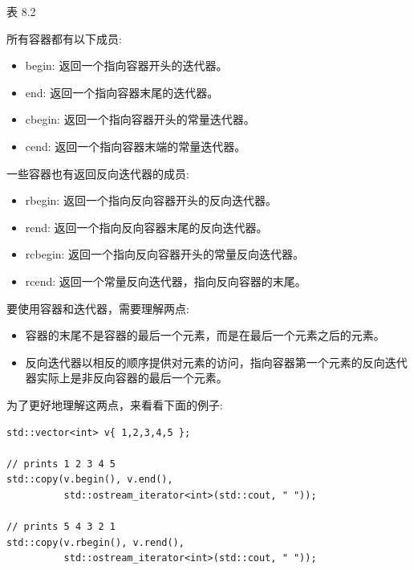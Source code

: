 \begin{center}
表 8.2
\end{center}

所有容器都有以下成员:

\begin{itemize}
\item
begin: 返回一个指向容器开头的迭代器。

\item
end: 返回一个指向容器末尾的迭代器。

\item
cbegin: 返回一个指向容器开头的常量迭代器。

\item
cend: 返回一个指向容器末端的常量迭代器。
\end{itemize}

一些容器也有返回反向迭代器的成员:

\begin{itemize}
\item
rbegin: 返回一个指向反向容器开头的反向迭代器。

\item
rend: 返回一个指向反向容器末尾的反向迭代器。

\item
rcbegin: 返回一个指向反向容器开头的常量反向迭代器。

\item
rcend: 返回一个常量反向迭代器，指向反向容器的末尾。
\end{itemize}

要使用容器和迭代器，需要理解两点:

\begin{itemize}
\item
容器的末尾不是容器的最后一个元素，而是在最后一个元素之后的元素。

\item
反向迭代器以相反的顺序提供对元素的访问，指向容器第一个元素的反向迭代器实际上是非反向容器的最后一个元素。
\end{itemize}

为了更好地理解这两点，来看看下面的例子:

\begin{lstlisting}[style=styleCXX]
std::vector<int> v{ 1,2,3,4,5 };

// prints 1 2 3 4 5
std::copy(v.begin(), v.end(),
		  std::ostream_iterator<int>(std::cout, " "));

// prints 5 4 3 2 1
std::copy(v.rbegin(), v.rend(),
		  std::ostream_iterator<int>(std::cout, " "));
\end{lstlisting}

